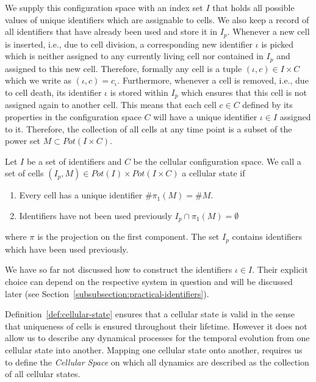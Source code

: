 We supply this configuration space with an index set $I$ that holds all possible values of unique
identifiers which are assignable to cells.
We also keep a record of all identifiers that have already been used and store it in $I_p$.
Whenever a new cell is inserted, i.e., due to cell division, a corresponding new identifier $\iota$
is picked which is neither assigned to any currently living cell nor contained in $I_p$ and assigned
to this new cell.
Therefore, formally any cell is a tuple $(\iota,c)\in I\times C$ which we write as
$(\iota,c)=c_\iota$.
Furthermore, whenever a cell is removed, i.e., due to cell death, its identifier $\iota$ is stored
within $I_p$ which ensures that this cell is not assigned again to another cell.
This means that each cell $c\in C$ defined by its properties in the configuration space $C$ will
have a unique identifier $\iota\in I$ assigned to it.
Therefore, the collection of all cells at any time point is a subset of the power set
$M\subset Pot(I\times C)$.

\begin{definition}
    \label{def:cellular-state}
    Let $I$ be a set of identifiers and $C$ be the cellular configuration space.
    We call a set of cells $(I_p,M)\in Pot(I)\times Pot(I\times C)$ a cellular state if
    \begin{enumerate}
        \item Every cell has a unique identifier $\#\pi_1(M)=\#M$.
        \item Identifiers have not been used previously $I_p\cap\pi_1(M)=\emptyset$
    \end{enumerate}
    where $\pi$ is the projection on the first component.
    The set $I_p$ contains identifiers which have been used previously.
\end{definition}

We have so far not discussed how to construct the identifiers $\iota\in I$.
Their explicit choice can depend on the respective system in question and will be discussed later
(see Section~\ref{subsubsection:practical-identifiers}).

Definition~\ref{def:cellular-state} ensures that a cellular state is valid in the sense that
uniqueness of cells is ensured throughout their lifetime.
However it does not allow us to describe any dynamical processes for the temporal evolution from one
cellular state into another.
Mapping one cellular state onto another, requires us to define the \textit{Cellular Space} on which
all dynamics are described as the collection of all cellular states.


